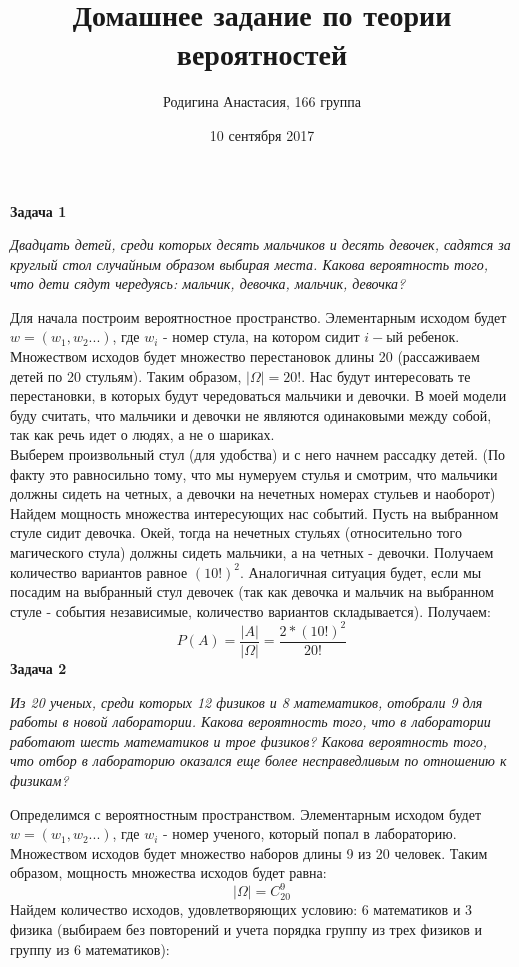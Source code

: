 \documentclass{article}
\title{Домашнее задание по теории вероятностей}
\author{Родигина Анастасия, 166 группа}
\date{10 сентября 2017}
\begin{document}
            

\maketitle  
 \noindent \textbf{Задача 1}
\begin{center} 
\textit{Двадцать детей, среди которых десять мальчиков и десять девочек, садятся за круглый стол случайным образом выбирая места. Какова вероятность того, что дети сядут чередуясь: мальчик, девочка, мальчик, девочка?}
\end{center}
Для начала построим вероятностное пространство. Элементарным исходом будет $w=(w_1, w_2...)$, где $w_i$ - номер стула, на котором сидит $i-$ый ребенок. Множеством исходов будет множество перестановок длины 20 (рассаживаем детей по 20 стульям). Таким образом, $|\Omega|=20!$. Нас будут интересовать те перестановки, в которых будут чередоваться мальчики и девочки. В моей модели буду считать, что мальчики и девочки не являются одинаковыми между собой, так как речь идет о людях, а не о шариках.\\
Выберем произвольный стул (для удобства) и с него начнем рассадку детей. (По факту это равносильно тому, что мы нумеруем стулья и смотрим, что мальчики должны сидеть на четных, а девочки на нечетных номерах стульев и наоборот)\\
Найдем мощность множества интересующих нас событий. Пусть на выбранном стуле сидит девочка. Окей, тогда на нечетных стульях (относительно того магического стула) должны сидеть мальчики, а на четных - девочки. Получаем количество вариантов равное $(10!)^2$. Аналогичная ситуация будет, если мы посадим на выбранный стул девочек (так как девочка и мальчик на выбранном стуле - события независимые, количество вариантов складывается). Получаем:
$$P(A)=\frac{|A|}{|\Omega|}=\frac{2*(10!)^2}{20!}$$
\textbf{Задача 2}
\begin{center}
\textit{Из 20 ученых, среди которых 12 физиков и 8 математиков, отобрали 9 для работы в новой лаборатории. Какова вероятность того, что в лаборатории работают шесть математиков и трое физиков? Какова вероятность того, что отбор в лабораторию оказался еще более несправедливым по отношению к физикам?}
\end{center}
Определимся с вероятностным пространством. Элементарным исходом будет $w=(w_1, w_2...)$, где $w_i$ - номер ученого, который попал в лабораторию. Множеством исходов будет множество наборов длины 9 из 20 человек. Таким образом, мощность множества исходов будет равна: 
$$|\Omega|=C_{20}^9$$
Найдем количество исходов, удовлетворяющих условию: 6 математиков и 3 физика (выбираем без повторений и учета порядка группу из трех физиков и группу из 6 математиков):
\end{document}
